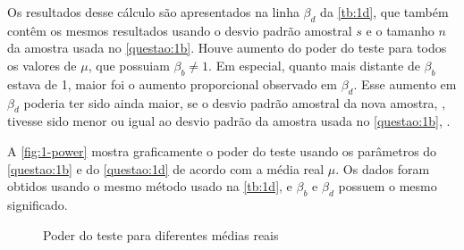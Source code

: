 \inputminted{r}{questao1/d-2.R}

Os resultados desse cálculo são apresentados na linha $\beta_d$ da \autoref{tb:1d}, que também contêm os mesmos resultados usando o desvio padrão amostral $s$ e o tamanho $n$ da amostra usada no \autoref{questao:1b}. Houve aumento do poder do teste para todos os valores de $\mu$, que possuiam $\beta_b \neq 1$. Em especial, quanto mais distante de $\beta_b$ estava de 1, maior foi o aumento proporcional observado em $\beta_d$. Esse aumento em $\beta_d$ poderia ter sido ainda maior, se o desvio padrão amostral da nova amostra, \UMDs, tivesse sido menor ou igual ao desvio padrão da amostra usada no \autoref{questao:1b}, \UMAs.



A \autoref{fig:1-power} mostra graficamente o poder do teste usando os parâmetros do \autoref{questao:1b} e do \autoref{questao:1d} de acordo com a média real $\mu$. Os dados foram obtidos usando o mesmo método usado na \autoref{tb:1d}, e $\beta_b$ e $\beta_d$ possuem o mesmo significado.

\begin{figure}[ht]
  \centering
  
  \caption{Poder do teste para diferentes médias reais}
  \label{fig:1-power}
\end{figure}

